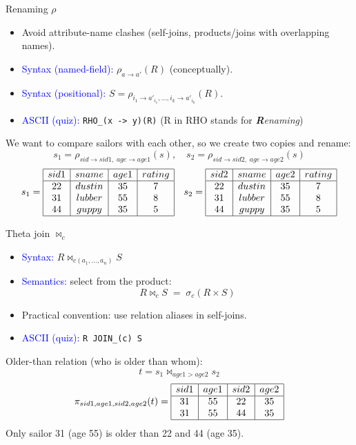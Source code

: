 \documentclass[10pt,aspectratio=169]{beamer}
\newcommand{\select}{\sigma}
\newcommand{\proj}{\pi}
\newcommand{\rename}{\rho}
\begin{document}
\begin{frame}{Renaming \(\rename\)}
\begin{itemize}
  \item Avoid attribute-name clashes (self-joins, products/joins with overlapping names).
  \item \textcolor{blue}{Syntax (named-field):} \(\rename_{a\rightarrow a'}(R)\) (conceptually).
  \item \textcolor{blue}{Syntax (positional):}
        \(S=\rename_{i_1\rightarrow a'_{i_1},\dots,i_k\rightarrow a'_{i_k}}(R)\).
  \item \textcolor{blue}{ASCII (quiz):} \texttt{RHO\_(x -> y)(R)} (R in RHO stands for \textit{\textbf{R}enaming})
\end{itemize}

\vspace{0.4em}
\small
We want to compare sailors with each other, so we create two copies and rename:
\[
s_1=\rename_{sid\rightarrow sid1,\;age\rightarrow age1}(s),
\quad
s_2=\rename_{sid\rightarrow sid2,\;age\rightarrow age2}(s)
\]
\[
s_1=\begin{array}{|c|c|c|c|}\hline
sid1&sname&age1&rating\\\hline
22&dustin&35&7\\
31&lubber&55&8\\
44&guppy&35&5\\\hline
\end{array}
\quad
s_2=\begin{array}{|c|c|c|c|}\hline
sid2&sname&age2&rating\\\hline
22&dustin&35&7\\
31&lubber&55&8\\
44&guppy&35&5\\\hline
\end{array}
\]
\end{frame}
\begin{frame}{Theta join \(\Join_{c}\)}
\begin{itemize}
  \item \textcolor{blue}{Syntax:} \(R \Join_{c(a_1,\dots,a_n)} S\)
  \item \textcolor{blue}{Semantics:} select from the product:
  \[
  R \Join_c S \;=\; \select_c(R\times S)
  \]
  \item Practical convention: use relation aliases in self-joins.
  \item \textcolor{blue}{ASCII (quiz):} \texttt{R JOIN\_(c) S}
\end{itemize}

\vspace{0.4em}
\small
Older-than relation (who is older than whom):
\[
t=s_1\Join_{age1>age2}s_2
\]
\[
\proj_{sid1,age1,sid2,age2}(t)=
\begin{array}{|c|c|c|c|}\hline
sid1&age1&sid2&age2\\\hline
31&55&22&35\\
31&55&44&35\\\hline
\end{array}
\]
\small Only sailor 31 (age 55) is older than 22 and 44 (age 35).
\end{frame}
\end{document}
